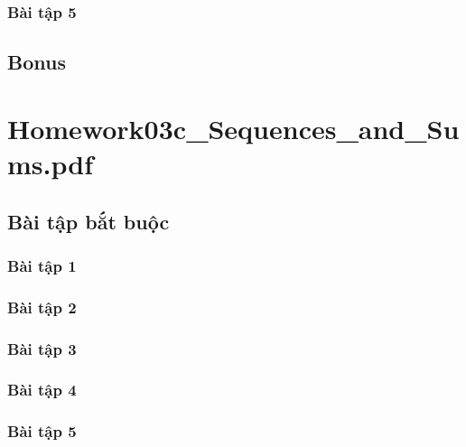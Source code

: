 \documentclass[a4paper]{article}
\begin{document}
\subsubsection{Bài tập 5}

\clearpage

\subsection{Bonus}
\clearpage

\section{Homework03c\_Sequences\_and\_Sums.pdf}
\subsection{Bài tập bắt buộc}
\subsubsection{Bài tập 1}

\clearpage
\subsubsection{Bài tập 2}

\clearpage
\subsubsection{Bài tập 3}

\clearpage
\subsubsection{Bài tập 4}

\clearpage
\subsubsection{Bài tập 5}

\clearpage

\clearpage
\end{document}
